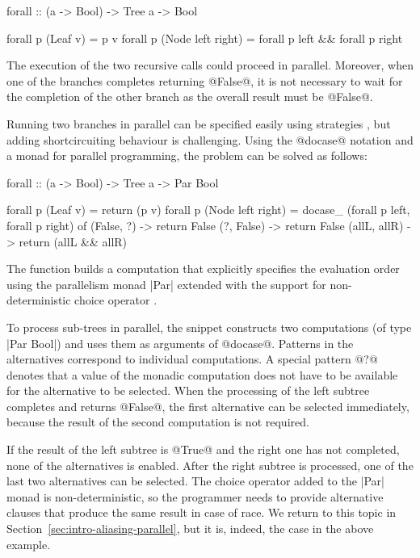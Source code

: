 \documentclass[preprint]{sigplanconf}
\begin{document}
\begin{code}
forall :: (a -> Bool) -> Tree a -> Bool

forall p (Leaf v)           = p v
forall p (Node left right)  = forall p left && forall p right
\end{code}
The execution of the two recursive calls could proceed in parallel. Moreover, when one of the 
branches completes returning @False@, it is not necessary to wait for the completion of the other 
branch as the overall result must be @False@.

Running two branches in parallel can be specified easily using strategies \cite{strategies-new, strategies-old}, 
but adding shortcircuiting behaviour is challenging. Using the @docase@ notation and a monad for 
parallel programming, the problem can be solved as follows:

\begin{code}
forall :: (a -> Bool) -> Tree a -> Par Bool

forall p (Leaf v)           = return (p v)
forall p (Node left right)  = 
  docase_ (forall p left, forall p right) of
    (False, ?)    -> return False
    (?, False)    -> return False
    (allL, allR)  -> return (allL && allR)
\end{code}
The function builds a computation that explicitly specifies the evaluation order using the
parallelism monad |Par| \cite{parmonad} extended with the support for non-deterministic choice 
operator \cite{parmonad-cancellation}.

To process sub-trees in parallel, the snippet constructs two computations (of type |Par Bool|) 
and uses them as arguments of @docase@. Patterns in the alternatives correspond to individual
computations. A special pattern @?@ denotes that a value of the monadic computation does not 
have to be available for the alternative to be selected. When the processing of the left subtree 
completes and returns @False@, the first alternative can be selected immediately, because the 
result of the second computation is not required.

If the result of the left subtree is @True@ and the right one has not completed, none of 
the alternatives is enabled. After the right subtree is processed, one of the last two alternatives 
can be selected. The choice operator added to the |Par| monad is non-deterministic, so the 
programmer needs to provide alternative clauses that produce the same result in case of race.
We return to this topic in Section~\ref{sec:intro-aliasing-parallel}, but it is, indeed, 
the case in the above example.
\end{document}
